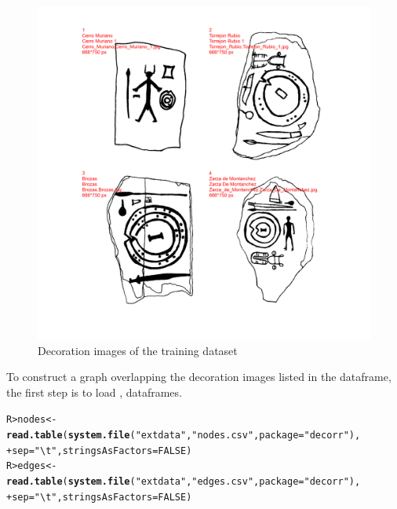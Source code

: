 \documentclass[article]{jss}\usepackage[]{graphicx}\usepackage[]{color}
\makeatletter
\def\maxwidth{ %
  \ifdim\Gin@nat@width>\linewidth
    \linewidth
  \else
    \Gin@nat@width
  \fi
}
\newcommand{\hlnum}[1]{\textcolor[rgb]{0.686,0.059,0.569}{#1}}%
\newcommand{\hlstr}[1]{\textcolor[rgb]{0.192,0.494,0.8}{#1}}%
\newcommand{\hlstd}[1]{\textcolor[rgb]{0.345,0.345,0.345}{#1}}%
\newcommand{\hlkwb}[1]{\textcolor[rgb]{0.69,0.353,0.396}{#1}}%
\newcommand{\hlkwc}[1]{\textcolor[rgb]{0.333,0.667,0.333}{#1}}%
\newcommand{\hlkwd}[1]{\textcolor[rgb]{0.737,0.353,0.396}{\textbf{#1}}}%
\newenvironment{kframe}{%
 \def\at@end@of@kframe{}%
 \ifinner\ifhmode%
  \def\at@end@of@kframe{\end{minipage}}%
  \begin{minipage}{\columnwidth}%
 \fi\fi%
 \def\FrameCommand##1{\hskip\@totalleftmargin \hskip-\fboxsep
 \colorbox{shadecolor}{##1}\hskip-\fboxsep
     \hskip-\linewidth \hskip-\@totalleftmargin \hskip\columnwidth}%
 \MakeFramed {\advance\hsize-\width
   \@totalleftmargin\z@ \linewidth\hsize
   \@setminipage}}%
 {\par\unskip\endMakeFramed%
 \at@end@of@kframe}
\newenvironment{knitrout}{}{} %
\makeatother
\begin{document}
\begin{knitrout}
\begin{figure}[H]
{\centering \includegraphics[width=\maxwidth]{figure/unnamed-chunk-4-1} 

}

\caption{\label{fig:figs}Decoration images of the training dataset}\label{fig:unnamed-chunk-4}
\end{figure}


\end{knitrout}

To construct a graph overlapping the decoration images listed in the  dataframe, the first step is to load ,  dataframes.

\begin{knitrout}
\color{fgcolor}\begin{kframe}
\begin{alltt}
\hlstd{R> }\hlstd{nodes} \hlkwb{<-} \hlkwd{read.table}\hlstd{(}\hlkwd{system.file}\hlstd{(}\hlstr{"extdata"}\hlstd{,} \hlstr{"nodes.csv"}\hlstd{,} \hlkwc{package} \hlstd{=} \hlstr{"decorr"}\hlstd{),}
\hlstd{+ }                    \hlkwc{sep}\hlstd{=}\hlstr{"\textbackslash{}t"}\hlstd{,}\hlkwc{stringsAsFactors} \hlstd{=} \hlnum{FALSE}\hlstd{)}
\hlstd{R> }\hlstd{edges} \hlkwb{<-} \hlkwd{read.table}\hlstd{(}\hlkwd{system.file}\hlstd{(}\hlstr{"extdata"}\hlstd{,} \hlstr{"edges.csv"}\hlstd{,} \hlkwc{package} \hlstd{=} \hlstr{"decorr"}\hlstd{),}
\hlstd{+ }                    \hlkwc{sep}\hlstd{=}\hlstr{"\textbackslash{}t"}\hlstd{,}\hlkwc{stringsAsFactors} \hlstd{=} \hlnum{FALSE}\hlstd{)}
\end{alltt}
\end{kframe}
\end{knitrout}
\end{document}
